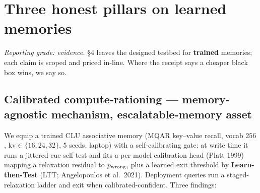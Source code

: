 \documentclass[11pt]{article}
\begin{document}
\section{Three honest pillars on learned memories}
\emph{Reporting grade: evidence.} \S4 leaves the designed testbed for \textbf{trained} memories; each claim is scoped and priced in-line. Where the receipt says a cheaper black box wins, we say so.

\subsection{Calibrated compute-rationing --- memory-agnostic mechanism, escalatable-memory asset}
We equip a trained CLU associative memory (MQAR key--value recall, vocab $256$, kv$\in\{16,24,32\}$, $5$ seeds, laptop) with a self-calibrating gate: at write time it runs a jittered-cue self-test and fits a per-model calibration head (Platt 1999) mapping a relaxation residual to $p_{\rm wrong}$, plus a learned exit threshold by \textbf{Learn-then-Test} (LTT; Angelopoulos et al.\ 2021). Deployment queries run a staged-relaxation ladder and exit when calibrated-confident. Three findings:
\end{document}
